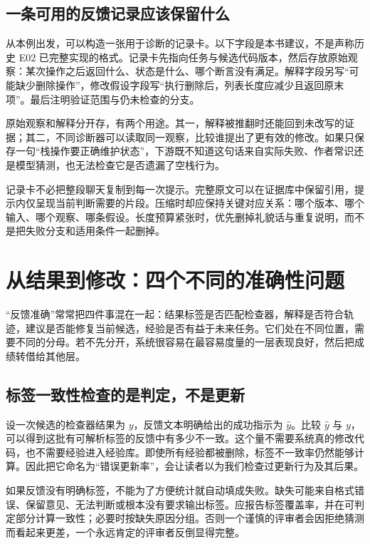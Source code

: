 \subsection{一条可用的反馈记录应该保留什么}

从本例出发，可以构造一张用于诊断的记录卡。以下字段是本书建议，不是声称历史 E02 已完整实现的格式。记录卡先指向任务与候选代码版本，然后存放原始观察：某次操作之后返回什么、状态是什么、哪个断言没有满足。解释字段另写“可能缺少删除操作”，修改假设字段写“执行删除后，列表长度应减少且返回原末项”。最后注明验证范围与仍未检查的分支。

原始观察和解释分开存，有两个用途。其一，解释被推翻时还能回到未改写的证据；其二，不同诊断器可以读取同一观察，比较谁提出了更有效的修改。如果只保存一句“栈操作要正确维护状态”，下游既不知道这句话来自实际失败、作者常识还是模型猜测，也无法检查它是否遗漏了空栈行为。

记录卡不必把整段聊天复制到每一次提示。完整原文可以在证据库中保留引用，提示内仅呈现当前判断需要的片段。压缩时却应保持关键对应关系：哪个版本、哪个输入、哪个观察、哪条假设。长度预算紧张时，优先删掉礼貌话与重复说明，而不是把失败分支和适用条件一起删掉。

\section{从结果到修改：四个不同的准确性问题}
\label{sec:ch04-four-links}

“反馈准确”常常把四件事混在一起：结果标签是否匹配检查器，解释是否符合轨迹，建议是否能修复当前候选，经验是否有益于未来任务。它们处在不同位置，需要不同的分母。若不先分开，系统很容易在最容易度量的一层表现良好，然后把成绩转借给其他层。

\subsection{标签一致性检查的是判定，不是更新}

设一次候选的检查器结果为 $y$，反馈文本明确给出的成功指示为 $\hat y$。比较 $\hat y$ 与 $y$，可以得到这批有可解析标签的反馈中有多少不一致。这个量不需要系统真的修改代码，也不需要经验进入经验库。即使所有经验都被删除，标签不一致率仍然能够计算。因此把它命名为“错误更新率”，会让读者以为我们检查过更新行为及其后果。

如果反馈没有明确标签，不能为了方便统计就自动填成失败。缺失可能来自格式错误、保留意见、无法判断或根本没有要求输出标签。应报告标签覆盖率，并在可判定部分计算一致性；必要时按缺失原因分组。否则一个谨慎的评审者会因拒绝猜测而看起来更差，一个永远肯定的评审者反倒显得完整。

